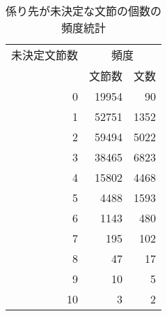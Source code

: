 \begin{table}[t]
  \caption{係り先が未決定な文節の個数の頻度統計}
  \label{tab:hindo_toukei}
  \begin{center}
\small\small\renewcommand{\arraystretch}{}
\begin{tabular}[c]{|r|r|r|}\hline 
未決定文節数 & \multicolumn{2}{c|}{頻度}\\\cline{2-3}
    &   \multicolumn{1}{c|}{文節数} & \multicolumn{1}{c|}{文数}\\\hline
  0 &      19954 &         90\\
  1 &      52751 &       1352\\
  2 &      59494 &       5022\\
  3 &      38465 &       6823\\
  4 &      15802 &       4468\\
  5 &       4488 &       1593\\
  6 &       1143 &        480\\
  7 &        195 &        102\\
  8 &         47 &         17\\
  9 &         10 &          5\\
 10 &          3 &          2\\\hline
\end{tabular}
\end{center}
\end{table}

